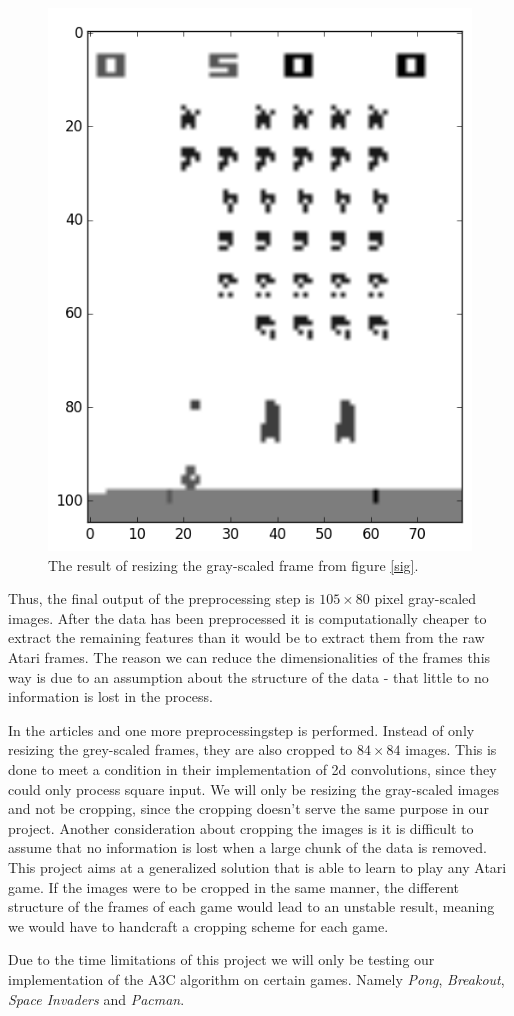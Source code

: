 \documentclass[11pt]{article}
\begin{document}
\begin{figure}[!h]
    \centering
    \includegraphics[scale=0.35]{include/space_invaders_1_gray_resized.png}
    \caption{The result of resizing the gray-scaled frame from figure \ref{sig}.}
    \label{fig:sigr}
\end{figure}

Thus, the final output of the preprocessing step is $105 \times 80$ pixel gray-scaled
images.
After the data has been preprocessed it is computationally cheaper to extract the remaining
features than it would be to extract them from the raw Atari frames.
The reason we can reduce the dimensionalities of the frames this way
is due to an assumption about the structure of the data - that
little to no information is lost in the process.



In the articles \cite{a3c} and \cite{dqn} one more preprocessingstep is performed.
Instead of only resizing the grey-scaled frames, they are also cropped to $84 \times 84$ images.
This is done to meet a condition in their implementation of 2d convolutions,
since they could only process square input\cite{dqn-nature}.
We will only be resizing the gray-scaled images and not be cropping,
since the cropping doesn't serve the same purpose in our project.
Another consideration about cropping the images is it is difficult to assume that no
information is lost when a large chunk of the data is removed.
This project aims at a generalized solution that is able to learn to play any Atari game.
If the images were to be cropped in the same manner,
the different structure of the frames of each game would lead to an unstable
result, meaning we would have to handcraft a cropping scheme for each game.

Due to the time limitations of this project we will only be testing our
implementation of the A3C algorithm on certain games.
Namely \textit{Pong}, \textit{Breakout}, \textit{Space Invaders} and
\textit{Pacman}.
\end{document}
